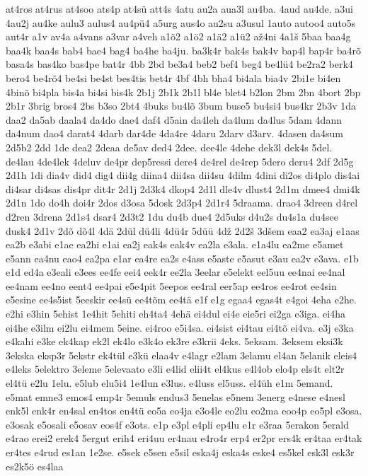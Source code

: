 {at4ros
at4rus
at4soo
ats4p
at4sü
att4s
4atu
au2a
aua3l
au4ba.
4aud
au4de.
a3ui
4au2j
au4ke
aulu3
aulus4
au4pü4
a5urg
aus4o
au2su
a3usul
1auto
autoo4
auto5s
aut4r
a1v
av4a
a4vans
a3var
a4veh
a1õ2
a1ö2
a1ä2
a1ü2
až4ni
4a1š
5baa
baa4g
baa4k
baa4s
bab4
bae4
bag4
ba4he
ba4ju.
ba3k4r
bak4s
bak4v
bap4l
bap4r
ba4rõ
basa4s
bas4ko
bas4pe
bat4r
4bb
2bd
be3a4
beb2
bef4
beg4
be4lü4
be2ra2
berk4
bero4
be4rõ4
be4si
be4st
bes4tis
bet4r
4bf
4bh
bha4
bi4ala
bia4v
2bi1e
bi4en
4binõ
bi4pla
bis4a
bi4si
bis4k
2b1j
2b1k
2b1l
bl4e
blet4
b2lon
2bm
2bn
4bort
2bp
2b1r
3brig
bros4
2bs
b3so
2bt4
4buks
bu4lõ
3bum
buse5
bu4si4
bus4kr
2b3v
1da
daa2
da5ab
daala4
da4do
dae4
daf4
d5ain
da4leh
da4lum
da4lus
5dam
4dann
da4num
dao4
darat4
4darb
dar4de
4da4re
4daru
2darv
d3arv.
4dasen
da4sum
2d5b2
2dd
1de
dea2
2deaa
de5av
ded4
2dee.
dee4le
4dehe
dek3l
dek4s
5del.
de4lau
4de4lek
4deluv
de4pr
dep5ressi
dere4
de4rel
de4rep
5dero
deru4
2df
2d5g
2d1h
1di
dia4v
did4
dig4
dii4g
diina4
dii4sa
dii4su
4dilm
4dini
di2os
di4plo
dis4ai
di4sar
di4sas
dis4pr
dit4r
2d1j
2d3k4
dkop4
2d1l
dle4v
dlust4
2d1m
dmee4
dmi4k
2d1n
1do
do4h
doi4r
2dos
d3osa
5dosk
2d3p4
2d1r4
5draama.
drao4
3dreen
d4rel
d2ren
3drena
2d1s4
dsar4
2d3t2
1du
du4b
due4
2d5uks
d4u2s
du4s1a
du4see
dusk4
2d1v
2dõ
dõ4l
4dä
2dül
dü4li
4dü4r
5düü
4dž
2d2š
3dšem
eaa2
ea3aj
e1aas
ea2b
e3abi
e1ae
ea2hi
e1ai
ea2j
eak4s
eak4v
ea2la
e3ala.
e1a4lu
ea2me
e5amet
e5ann
ea4nu
eao4
ea2pa
e1ar
ea4re
ea2s
e4ass
e5aste
e5asut
e3au
ea2v
e3ava.
e1b
e1d
ed4a
e3eali
e3ees
ee4fe
eei4
eek4r
ee2la
3eelar
e5elekt
eel5uu
ee4nai
ee4nal
ee4nam
ee4no
eent4
ee4pai
e5e4pit
5eepos
ee4ral
eer5ap
ee4ros
ee4rot
ee4sin
e5esine
ee4s5ist
5eeskir
ee4sü
ee4tõm
ee4tä
e1f
e1g
egaa4
egas4t
e4goi
4eha
e2he.
e2hi
e3hin
5ehist
1e4hit
5ehiti
eh4ta4
4ehä
ei4dul
ei4e
eie5ri
ei2ga
e3iga.
ei4ha
ei4he
e3ilm
ei2lu
ei4mem
5eine.
ei4roo
e5i4sa.
ei4sist
ei4tau
ei4tõ
ei4va.
e3j
e3ka
e4kahi
e3ke
ek4kap
ek2l
ek4lo
e3k4o
ek3re
e3krii
4eks.
5eksam.
3eksem
eksi3k
3ekska
eksp3r
5ekstr
ek4tül
e3kü
elaa4v
e4lagr
e2lam
3elamu
el4an
5elanik
eleis4
e4leks
5elektro
3eleme
5elevaato
e3li
e4lid
elii4t
el4kus
e4l4ob
elo4p
els4t
elt2r
el4tü
e2lu
1elu.
e5lub
elu5i4
1e4lun
e3lus.
e4luss
el5uss.
el4üh
e1m
5emand.
e5mat
emne3
emos4
emp4r
5emuls
endus3
5enelas
e5nem
3energ
e4nese
e4nesl
enk5l
enk4r
en4sal
en4tos
en4tü
eo5a
eo4ja
e3o4le
eo2lu
eo2ma
eoo4p
eo5pl
e3osa.
e3osak
e5osali
e5osav
eos4f
e3ots.
e1p
e3pl
e4pli
ep4lu
e1r
e3raa
5erakon
5erald
e4rao
erei2
erek4
5ergut
erih4
eri4uu
er4nau
e4ro4r
erp4
er2pr
ers4k
er4taa
er4tak
er4tes
e4rud
es1an
1e2se.
e5sek
e5sen
e5sil
eska4j
eska4s
eske4
es5kel
esk3l
esk3r
es2k5ö
es4laa
}
